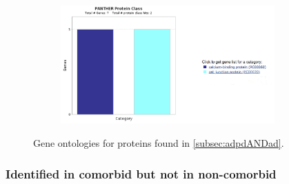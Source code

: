 \begin{figure}[H]
\begin{subfigure}[b]{0.5\linewidth}
\end{subfigure}
\begin{subfigure}[b]{0.5\linewidth}
\centering
\includegraphics[width=0.9\textwidth]{./Figures/GO/adpdANDad/adpdANDad4}\par
\end{subfigure}%
\begin{caption}
  {Gene ontologies for proteins found in \ref{subsec:adpdANDad}.}
\end{caption}
\end{figure}

\subsubsection{Identified in comorbid but not in non-comorbid}
\label{subsec:adpdNOTad}


